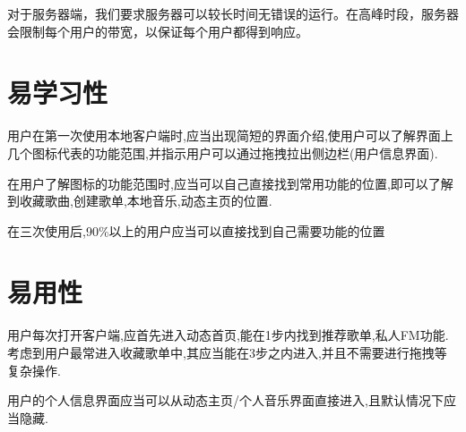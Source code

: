 对于服务器端，我们要求服务器可以较长时间无错误的运行。在高峰时段，服务器会限制每个用户的带宽，以保证每个用户都得到响应。

\section{易学习性}

用户在第一次使用本地客户端时,应当出现简短的界面介绍,使用户可以了解界面上几个图标代表的功能范围,并指示用户可以通过拖拽拉出侧边栏(用户信息界面).

在用户了解图标的功能范围时,应当可以自己直接找到常用功能的位置,即可以了解到收藏歌曲,创建歌单,本地音乐,动态主页的位置.

在三次使用后,90\%以上的用户应当可以直接找到自己需要功能的位置

\section{易用性}
用户每次打开客户端,应首先进入动态首页,能在1步内找到推荐歌单,私人FM功能.考虑到用户最常进入收藏歌单中,其应当能在3步之内进入,并且不需要进行拖拽等复杂操作.

用户的个人信息界面应当可以从动态主页/个人音乐界面直接进入,且默认情况下应当隐藏.


